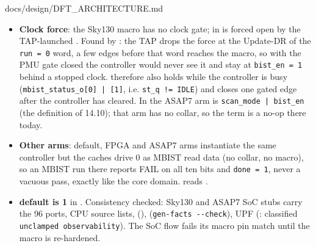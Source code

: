 \begin{relocated}{docs/design/DFT_ARCHITECTURE.md}
\begin{itemize}
  holding register and takes the third back into
  . Pin placement:  +
   on the N edge,  on the S edge,
  in the middle of existing inter-pin gaps on the met2 track grid, so no
  existing pin moves ( v5;
   PINS/NETS 407 -\textgreater{} 503, additions
  only).
\item
  \textbf{Clock force}: the Sky130 macro has no clock gate;
   in  is forced open by the TAP-launched
  . Found by
  : the TAP drops the
  force at the Update-DR of the \texttt{run\ =\allowbreak{}\ 0} word, a
  few  edges before that word reaches the macro, so
  with the PMU gate closed the controller would never see it and stay at
  \texttt{bist\_\allowbreak{}en\ =\allowbreak{}\ 1} behind a stopped
  clock.  therefore also holds while the controller is
  busy (\texttt{mbist\_\allowbreak{}status\_\allowbreak{}o[0]\ |\ [1]},
  i.e. \texttt{st\_\allowbreak{}q\ !=\allowbreak{}\ IDLE}) and closes
  one gated edge after the controller has cleared. In the ASAP7 arm
   is
  \texttt{scan\_\allowbreak{}mode\ |\ bist\_\allowbreak{}en} (the
  definition of 14.10); that arm has no collar, so the term is a no-op
  there today.
\item
  \textbf{Other arms}: default, FPGA and ASAP7 arms instantiate the same
  controller but the caches drive 0 as MBIST read data (no collar, no
  macro), so an MBIST run there reports FAIL on all ten bits and
  \texttt{done\ =\allowbreak{}\ 1}, never a vacuous pass, exactly like
  the core domain.  reads .
\item
  \textbf{ default is 1} in . Consistency
  checked: Sky130 and ASAP7 SoC stubs carry the 96 ports,
   CPU source lists, 
  (), 
  (\texttt{gen-\allowbreak{}facts\ -\allowbreak{}-\allowbreak{}check}),
  UPF (:  classified
  \texttt{unclamped\ observability}). The SoC flow fails its macro pin
  match until the macro is re-hardened.
\end{itemize}


\end{relocated}
